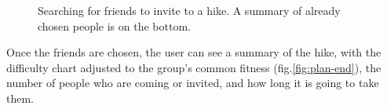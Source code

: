 \begin{figure}[h!]
    \centering
    \hfill
    \hfill
    \caption{Searching for friends to invite to a hike. A summary of already chosen people is on the bottom.}
    \label{fig:plan-invite-friends}
\end{figure}

Once the friends are chosen, the user can see a summary of the hike, with the difficulty chart adjusted to the group's common fitness (fig.\ref{fig:plan-end}), the number of people who are coming or invited, and how long it is going to take them.

